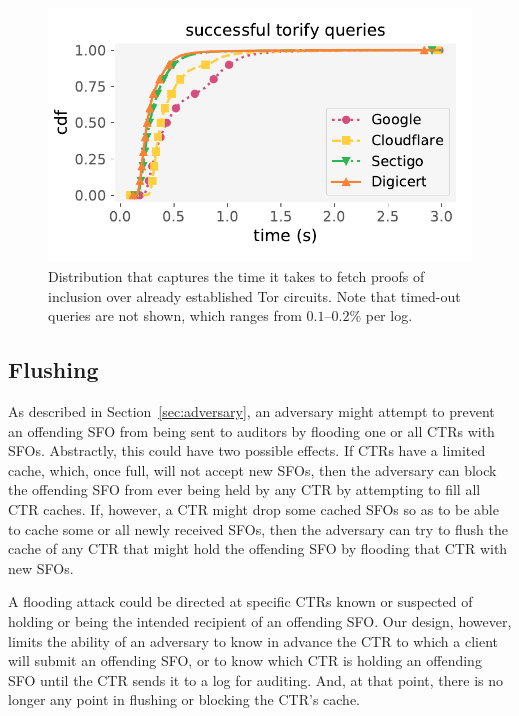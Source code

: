 \begin{figure}
	\centering
	\includegraphics[width=\columnwidth]{../exp/plot/img/incl-dist__torify}
	\caption{%
		Distribution that captures the time it takes to fetch proofs of
		inclusion over already established Tor circuits.  Note that timed-out
		queries are not shown, which ranges from $0.1$--$0.2$\% per log.
	}
	\label{fig:incl-dist}
\end{figure}

\subsection{Flushing}
\label{sec:flooding}

As described in Section~\ref{sec:adversary}, an adversary might attempt to
prevent an offending SFO from being sent to auditors by flooding
one or all CTRs with SFOs. Abstractly, this could have two possible
effects. If CTRs have a limited cache, which, once full, will not
accept new SFOs, then the adversary can block the offending SFO
from ever being held by any CTR by attempting to fill all
CTR caches. If, however, a CTR might drop some cached SFOs
so as to be able to cache some or all newly received SFOs, then
the adversary can try to flush the cache of any CTR that might
hold the offending SFO by flooding that CTR with new SFOs.

A flooding attack could be directed at specific CTRs
known or suspected of holding or being the intended recipient of
an offending SFO\@. Our design, however, limits the ability of
an adversary to know in advance the CTR to which a client will
submit an offending SFO, or to know which CTR is holding
an offending SFO until the CTR sends it to a log for auditing.
And, at that point, there is no longer any point in flushing
or blocking the CTR's cache.

